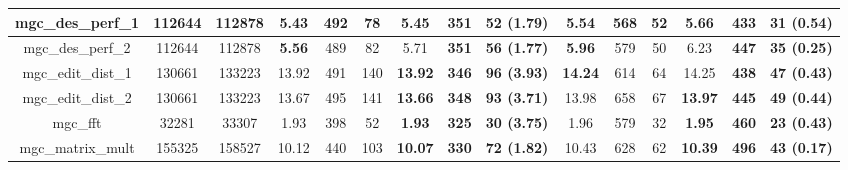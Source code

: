 \begin{table*}[]
{\begin{tabular}{|c||c|c|ccc|ccc||ccc|ccc|}
mgc\_des\_perf\_1          & 112644                   & 112878                 & \multicolumn{1}{c|}{\textbf{5.43}} & \multicolumn{1}{c|}{492}       & 78      & \multicolumn{1}{c|}{5.45}           & \multicolumn{1}{c|}{\textbf{351}} & \textbf{52 (1.79)} & \multicolumn{1}{c|}{\textbf{5.54}}  & \multicolumn{1}{c|}{568}       & 52      & \multicolumn{1}{c|}{5.66}           & \multicolumn{1}{c|}{\textbf{433}} & \textbf{31 (0.54)} \\ \hline
mgc\_des\_perf\_2          & 112644                   & 112878                 & \multicolumn{1}{c|}{\textbf{5.56}} & \multicolumn{1}{c|}{489}       & 82      & \multicolumn{1}{c|}{5.71}           & \multicolumn{1}{c|}{\textbf{351}} & \textbf{56 (1.77)} & \multicolumn{1}{c|}{\textbf{5.96}}  & \multicolumn{1}{c|}{579}       & 50      & \multicolumn{1}{c|}{6.23}           & \multicolumn{1}{c|}{\textbf{447}} & \textbf{35 (0.25)} \\ \hline
mgc\_edit\_dist\_1         & 130661                   & 133223                 & \multicolumn{1}{c|}{13.92}         & \multicolumn{1}{c|}{491}       & 140     & \multicolumn{1}{c|}{\textbf{13.92}} & \multicolumn{1}{c|}{\textbf{346}} & \textbf{96 (3.93)} & \multicolumn{1}{c|}{\textbf{14.24}} & \multicolumn{1}{c|}{614}       & 64      & \multicolumn{1}{c|}{14.25}          & \multicolumn{1}{c|}{\textbf{438}} & \textbf{47 (0.43)} \\ \hline
mgc\_edit\_dist\_2         & 130661                   & 133223                 & \multicolumn{1}{c|}{13.67}         & \multicolumn{1}{c|}{495}       & 141     & \multicolumn{1}{c|}{\textbf{13.66}} & \multicolumn{1}{c|}{\textbf{348}} & \textbf{93 (3.71)} & \multicolumn{1}{c|}{13.98}          & \multicolumn{1}{c|}{658}       & 67      & \multicolumn{1}{c|}{\textbf{13.97}} & \multicolumn{1}{c|}{\textbf{445}} & \textbf{49 (0.44)} \\ \hline
mgc\_fft                   & 32281                    & 33307                  & \multicolumn{1}{c|}{1.93}          & \multicolumn{1}{c|}{398}       & 52      & \multicolumn{1}{c|}{\textbf{1.93}}  & \multicolumn{1}{c|}{\textbf{325}} & \textbf{30 (3.75)} & \multicolumn{1}{c|}{1.96}           & \multicolumn{1}{c|}{579}       & 32      & \multicolumn{1}{c|}{\textbf{1.95}}  & \multicolumn{1}{c|}{\textbf{460}} & \textbf{23 (0.43)} \\ \hline
mgc\_matrix\_mult          & 155325                   & 158527                 & \multicolumn{1}{c|}{10.12}         & \multicolumn{1}{c|}{440}       & 103     & \multicolumn{1}{c|}{\textbf{10.07}} & \multicolumn{1}{c|}{\textbf{330}} & \textbf{72 (1.82)} & \multicolumn{1}{c|}{10.43}          & \multicolumn{1}{c|}{628}       & 62      & \multicolumn{1}{c|}{\textbf{10.39}} & \multicolumn{1}{c|}{\textbf{496}} & \textbf{43 (0.17)} \\ \hline

\end{tabular}}
\end{table*}
